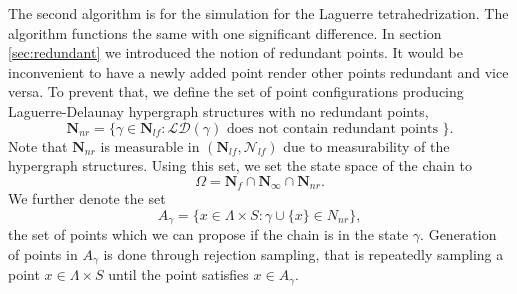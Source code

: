 The second algorithm is for the simulation for the Laguerre tetrahedrization. The algorithm functions the same with one significant difference. In section \ref{sec:redundant} we introduced the notion of redundant points. It would be inconvenient to have a newly added point render other points redundant and vice versa. To prevent that, we define the set of point configurations producing Laguerre-Delaunay hypergraph structures with no redundant points,
$$\mathbf N_{nr} = \{ \gamma \in \mathbf N_{lf}: \mathcal {LD}(\gamma) \text{ does not contain redundant points }\}.$$ 
Note that $\mathbf N_{nr}$ is  measurable in $(\mathbf N_{lf}, \mathcal N_{lf})$ due to measurability of the hypergraph structures.  Using this set, we set the state space of the chain to
$$\Omega = \mathbf N_f \cap \mathbf N_\infty \cap \mathbf N_{nr}.$$
We further denote the set 
$$A_\gamma = \{ x \in \Lambda \times S: \gamma\cup\{x\} \in N_{nr}\},$$
the set of points which we can propose if the chain is in the state $\gamma$. Generation of points in $A_\gamma$ is done through rejection sampling, that is repeatedly sampling a point $x\in \Lambda\times S$ until the point satisfies $x\in A_\gamma$.


